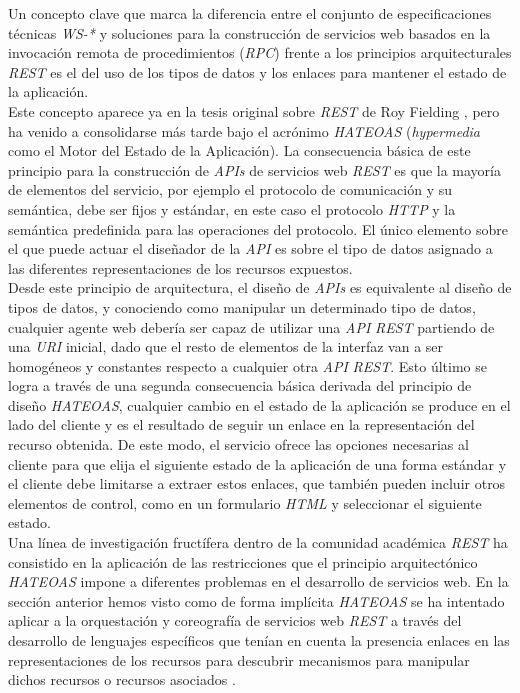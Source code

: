 Un concepto clave que marca la diferencia entre el conjunto de especificaciones t\'ecnicas \textit{WS-*} y soluciones para la construcci\'on de servicios web basados en la invocaci\'on remota de procedimientos (\textit{RPC}) frente a los principios arquitecturales \textit{REST} es el del uso de los tipos de datos y los enlaces para mantener el estado de la aplicaci\'on.\\
Este concepto aparece ya en la tesis original sobre \textit{REST} de Roy Fielding \cite{fielding2000representational}, pero ha venido a consolidarse m\'as tarde bajo el acr\'onimo \textit{HATEOAS} (\textit{hypermedia} como el Motor del Estado de la Aplicaci\'on). La consecuencia b\'asica de este principio para la construcci\'on de \textit{APIs} de servicios web \textit{REST} es que la mayor\'ia de elementos del servicio, por ejemplo el protocolo de comunicaci\'on y su sem\'antica, debe ser fijos y est\'andar, en este caso el protocolo \textit{HTTP} y la sem\'antica predefinida para las operaciones del protocolo. El \'unico elemento sobre el que puede actuar el dise\~nador de la \textit{API} es sobre el tipo de datos asignado a las diferentes representaciones de los recursos expuestos.\\
Desde este principio de arquitectura, el dise\~no de \textit{APIs} es equivalente al dise\~no de tipos de datos, y conociendo como manipular un determinado tipo de datos, cualquier agente web deber\'ia ser capaz de utilizar una \textit{API} \textit{REST} partiendo de una \textit{URI} inicial, dado que el resto de elementos de la interfaz van a ser homog\'eneos y constantes respecto a cualquier otra \textit{API} \textit{REST}. Esto \'ultimo se logra a trav\'es de una segunda consecuencia b\'asica derivada del principio de dise\~no \textit{HATEOAS}, cualquier cambio en el estado de la aplicaci\'on se produce en el lado del cliente y es el resultado de seguir un enlace en la representaci\'on del recurso obtenida. De este modo, el servicio ofrece las opciones necesarias al cliente para que elija el siguiente estado de la aplicaci\'on de una forma est\'andar y el cliente debe limitarse a extraer estos enlaces, que tambi\'en pueden incluir otros elementos de control, como en un formulario \textit{HTML} y seleccionar el siguiente estado.\\
Una l\'inea de investigaci\'on fruct\'ifera dentro de la comunidad acad\'emica \textit{REST} ha consistido en la aplicaci\'on de las restricciones que el principio arquitect\'onico \textit{HATEOAS} impone a diferentes problemas en el desarrollo de servicios web. En la secci\'on anterior hemos visto como de forma impl\'icita \textit{HATEOAS} se ha intentado aplicar a la orquestaci\'on y coreograf\'ia de servicios web \textit{REST} a trav\'es del desarrollo de lenguajes espec\'ificos que ten\'ian en cuenta la presencia enlaces en las representaciones de los recursos para descubrir mecanismos para manipular dichos recursos o recursos asociados \cite{alarcon2011hypermedia}.\\
